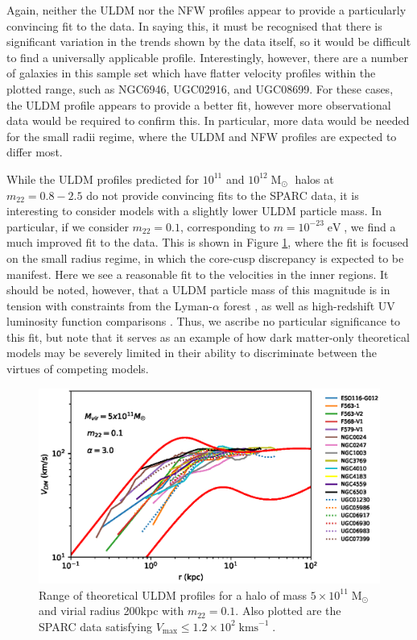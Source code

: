 \documentclass[a4paper,11pt]{article}
\begin{document}
Again, neither the ULDM nor the NFW profiles appear to provide a particularly convincing fit to the data. In saying this, it must be recognised that there is significant variation in the trends shown by the data itself, so it would be difficult to find a universally applicable profile. Interestingly, however, there are a number of galaxies in this sample set which have flatter velocity profiles within the plotted range, such as NGC6946, UGC02916, and UGC08699. For these cases, the ULDM profile appears to provide a better fit, however more observational data would be required to confirm this. In particular, more data would be needed for the small radii regime, where the ULDM and NFW profiles are expected to differ most. 

While the ULDM profiles predicted for $10^{11}$ and $10^{12} \operatorname{M}_{\odot}$ halos at $m_{22} = 0.8 - 2.5$ do not provide convincing fits to  the SPARC data, it is interesting to consider models with a slightly lower ULDM particle mass. In particular, if we consider $m_{22} = 0.1$, corresponding to $m = 10^{-23} \operatorname{eV}$, we find a much improved fit to the data. This is shown in Figure \ref{fig:velocity_23}, where the fit is focused on the small radius regime, in which the core-cusp discrepancy is expected to be manifest. Here we see a reasonable fit to the velocities in the inner regions. It should be noted, however, that a ULDM particle mass of this magnitude is in tension with constraints from the Lyman-$\alpha$ forest \cite{Amendola:2005ad}, as well as high-redshift UV luminosity function comparisons \cite{Bozek:2014uqa}. Thus, we ascribe no particular significance to this fit, but note that it serves as an example of how dark matter-only theoretical models may be severely limited in their ability to discriminate between the virtues of competing models.


\begin{figure}
\centering
\includegraphics[scale = 0.7, trim={0cm 2.5cm 1cm 0.35cm}]{pics/best_match.eps} 
\caption{Range of theoretical ULDM profiles for a halo of mass $5\times 10^{11}\operatorname{M}_{\odot}$ and virial radius 200kpc with $m_{22} = 0.1$. Also plotted are the SPARC data satisfying $V_{\mathrm{max}}\leq 1.2\times 10^2 \operatorname{kms}^{-1}$. }\label{fig:velocity_23}
\end{figure}
\end{document}
